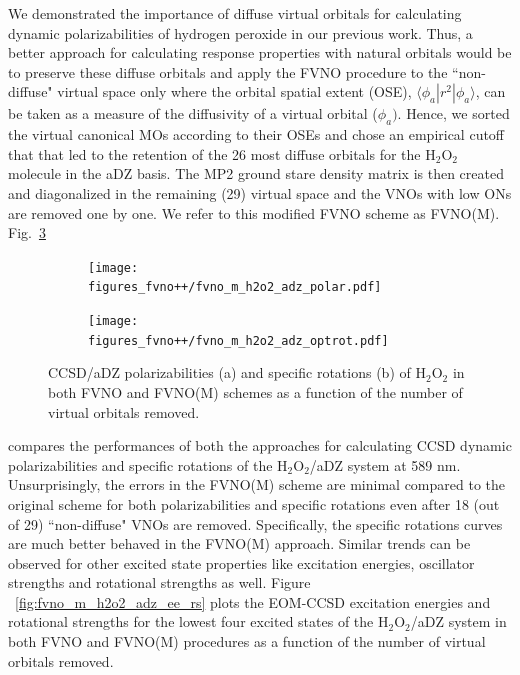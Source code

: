 We demonstrated the importance of diffuse virtual orbitals for calculating  
dynamic polarizabilities of hydrogen peroxide in our previous work.
Thus, a better approach for calculating response properties with natural
orbitals would be to preserve these diffuse orbitals and apply the FVNO procedure to the ``non-diffuse" virtual space only where the orbital spatial extent (OSE), $\langle\phi_a| r^2 | \phi_a\rangle$, can be taken as a measure of the diffusivity of a virtual orbital ($\phi_a)$. Hence, we sorted the virtual canonical MOs according to their OSEs and chose an empirical cutoff that that led to the retention of the 26 most diffuse orbitals for the H$_2$O$_2$ molecule in the aDZ basis. The MP2 ground stare density matrix is then created and diagonalized in the remaining (29) virtual space and the VNOs with low ONs are removed one by one. We refer to this modified FVNO scheme as FVNO(M). Fig.~\ref{fig:fvno_m_h2o2_adz_polar_optrot} %
\begin{figure}
\begin{subfigure}{.5\textwidth}
  \centering
  \texttt{[image: figures\_fvno++/fvno\_m\_h2o2\_adz\_polar.pdf]}
  \caption{}
  \label{fig:sfig1}
\end{subfigure}%
\begin{subfigure}{.5\textwidth}
  \centering
  \texttt{[image: figures\_fvno++/fvno\_m\_h2o2\_adz\_optrot.pdf]}
  \caption{}
  \label{fig:sfig2}
\end{subfigure}
\caption{{\footnotesize CCSD/aDZ polarizabilities (a) and specific rotations (b) of H$_2$O$_2$ in both FVNO and FVNO(M) schemes as a function of
the number of virtual orbitals removed.}}
\label{fig:fvno_m_h2o2_adz_polar_optrot}
\end{figure}
compares the performances of both the approaches for calculating CCSD dynamic polarizabilities and specific rotations of the H$_2$O$_2$/aDZ system at 589 nm. Unsurprisingly, the errors in the FVNO(M) scheme are minimal compared to the original scheme for both polarizabilities and specific rotations even after 18 (out of 29) ``non-diffuse" VNOs are removed. Specifically, the specific rotations curves are much better behaved in the FVNO(M) approach. Similar trends can be observed for other excited state properties like excitation energies, oscillator strengths and rotational strengths as well. Figure ~\ref{fig:fvno_m_h2o2_adz_ee_rs} plots the EOM-CCSD excitation energies and rotational strengths for the lowest four excited states of the H$_2$O$_2$/aDZ system in both FVNO and FVNO(M) procedures as a function of the number of virtual orbitals removed.
